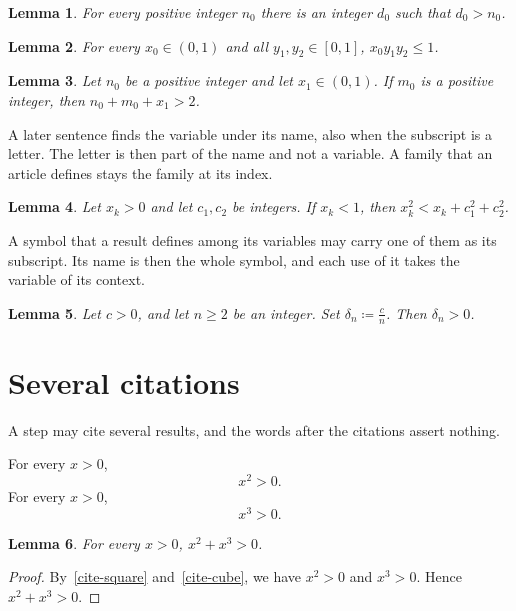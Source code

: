 \documentclass{article}
\newtheorem{lemma}{Lemma}
\begin{document}
\begin{lemma}\label{subscript-noun}
For every positive integer $n_0$ there is an integer $d_0$ such that $d_0>n_0$.
\end{lemma}

\begin{lemma}\label{subscript-domain}
For every $x_0\in(0,1)$ and all $y_1,y_2\in[0,1]$, $x_0y_1y_2\le1$.
\end{lemma}

\begin{lemma}\label{subscript-let}
Let $n_0$ be a positive integer and let $x_1\in(0,1)$. If $m_0$ is a positive integer, then
$n_0+m_0+x_1>2$.
\end{lemma}

A later sentence finds the variable under its name, also when the subscript is a letter.
The letter is then part of the name and not a variable. A family that an article defines
stays the family at its index.

\begin{lemma}\label{subscript-letter}
Let $x_k>0$ and let $c_1,c_2$ be integers. If $x_k<1$, then $x_k^2<x_k+c_1^2+c_2^2$.
\end{lemma}

A symbol that a result defines among its variables may carry one of them as its subscript.
Its name is then the whole symbol, and each use of it takes the variable of its context.

\begin{lemma}\label{subscript-defined}
Let $c>0$, and let $n\ge2$ be an integer. Set $\delta_n\coloneqq\frac cn$. Then $\delta_n>0$.
\end{lemma}

\section{Several citations}

A step may cite several results, and the words after the citations assert nothing.

For every $x>0$,
\begin{equation}\label{cite-square}
x^2>0 .
\end{equation}
For every $x>0$,
\begin{equation}\label{cite-cube}
x^3>0 .
\end{equation}

\begin{lemma}\label{cite-both}
For every $x>0$, $x^2+x^3>0$.
\end{lemma}
\begin{proof}
By~\eqref{cite-square} and~\eqref{cite-cube}, we have $x^2>0$ and $x^3>0$.
Hence $x^2+x^3>0$.
\end{proof}
\end{document}
